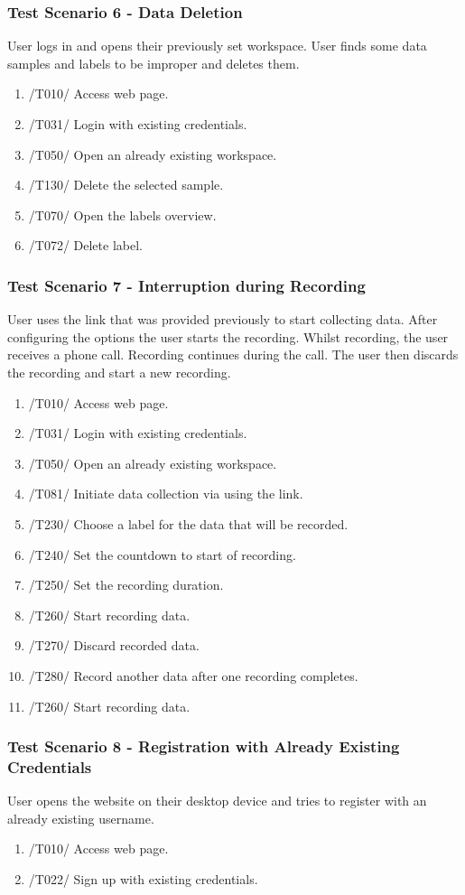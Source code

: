 \subsubsection{Test Scenario 6 - Data Deletion} 
User logs in and opens their previously set \gls{workspace}. User finds some \glspl{data sample} and labels to be improper and deletes them.
\begin{enumerate}
    \item /T010/ Access web page.
    \item /T031/ Login with existing credentials.
    \item /T050/ Open an already existing \gls{workspace}.
    \item /T130/ Delete the selected sample.
    \item /T070/ Open the labels overview.
    \item /T072/ Delete label.
\end{enumerate}
\subsubsection{Test Scenario 7 - Interruption during Recording}
User uses the link that was provided previously to start collecting data. After configuring the options the user starts the recording. Whilst recording, the user receives a phone call. Recording continues during the call. The user then discards the recording and start a new recording. 
\begin{enumerate}
    \item /T010/ Access web page.
    \item /T031/ Login with existing credentials.
    \item /T050/ Open an already existing \gls{workspace}.
    \item /T081/ Initiate data collection via using the link.
    \item /T230/ Choose a \gls{label} for the data that will be recorded.
    \item /T240/ Set the countdown to start of recording.
    \item /T250/ Set the recording duration.
    \item /T260/ Start recording data.
    \item /T270/ Discard recorded data.
    \item /T280/ Record another data after one recording completes.
    \item /T260/ Start recording data.
\end{enumerate}
\subsubsection{Test Scenario 8 - Registration with Already Existing Credentials}
User opens the website on their desktop device and tries to register with an already existing username.
\begin{enumerate}
    \item /T010/ Access web page.
    \item /T022/ Sign up with existing credentials.
\end{enumerate}
